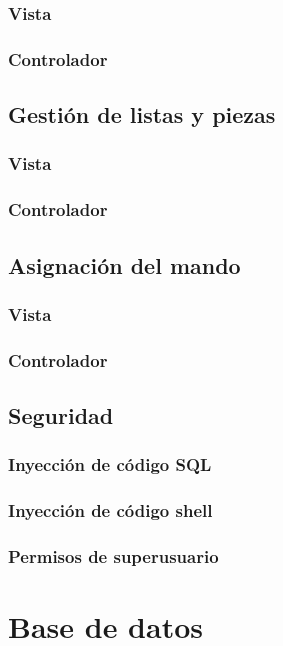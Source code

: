 \subsubsection{Vista}
\subsubsection{Controlador}

\subsection{Gestión de listas y piezas}
\subsubsection{Vista}
\subsubsection{Controlador}

\subsection{Asignación del mando}
\subsubsection{Vista}
\subsubsection{Controlador}

\subsection{Seguridad}
\subsubsection{Inyección de código SQL}
\subsubsection{Inyección de código shell}
\subsubsection{Permisos de superusuario}


\section{Base de datos}


